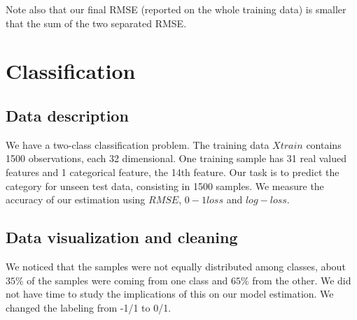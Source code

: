 \documentclass{article} %
\begin{document}
Note also that our final RMSE (reported on the whole training data) is smaller that the sum of the two separated RMSE.

\section{Classification}
\subsection{Data description}
We have a two-class classification problem. The training data $Xtrain$ contains 1500 observations, each 32 dimensional. One training sample has 31 real valued features and 1 categorical feature, the 14th feature. Our task is to predict the category for unseen test data, consisting in 1500 samples. We measure the accuracy of our estimation using $RMSE$, $0-1 loss$ and $log-loss$. 

\subsection{Data visualization and cleaning}
We noticed that the samples were not equally distributed among classes, about $35\%$ of the samples were coming from one class and $65\%$ from the other. We did not have time to study the implications of this on our model estimation. We changed the labeling from -1/1 to 0/1. 
\end{document}
